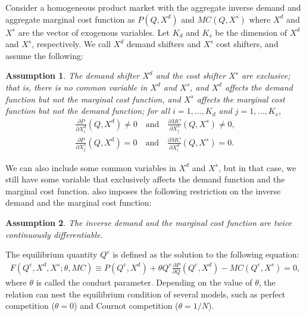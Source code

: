 \documentclass[11pt, a4paper]{article}
\newtheorem{assumption}{Assumption}
\theoremstyle{remark}
\begin{document}
Consider a homogeneous product market with the aggregate inverse demand and aggregate marginal cost function as $P(Q, X^{d})$ and $MC(Q, X^{s})$ where $X^{d}$ and $X^{s}$ are the vector of exogenous variables.
Let $K_d$ and $K_s$ be the dimension of $X^{d}$ and $X^{s}$, respectively.
We call $X^{d}$ demand shifters and $X^{s}$ cost shifters, and assume the following:
\begin{assumption}\label{assumption:exclusive_shifters}
    The demand shifter $X^{d}$ and the cost shifter $X^{s}$ are exclusive; that is, there is no common variable in $X^{d}$ and $X^{s}$, and $X^{d}$ affects the demand function but not the marginal cost function, and $X^{s}$ affects the marginal cost function but not the demand function; for all $i = 1, \ldots, K_d$ and $j = 1, \ldots, K_s$,
    \begin{align}
        \frac{\partial P}{\partial X^{d}_{i}}(Q, X^{d}) \ne 0 \quad \text{and} \quad \frac{\partial MC}{\partial X^{s}_{j}}(Q, X^{s}) \ne 0,\\
        \frac{\partial P}{\partial X^{s}_{j}}(Q, X^{d}) = 0 \quad \text{and} \quad \frac{\partial MC}{\partial X^{d}_{i}}(Q, X^{s}) = 0.
    \end{align}
\end{assumption}
We can also include some common variables in $X^{d}$ and $X^{s}$, but in that case, we still have some variable that exclusively affects the demand function and the marginal cost function.
\citet{lau1982identifying} also imposes the following restriction on the inverse demand and the marginal cost function:
\begin{assumption}\label{assumption:twice_differentiable}
    The inverse demand and the marginal cost function are twice continuously differentiable.
\end{assumption}

The equilibrium quantity $Q^e$ is defined as the solution to the following equation:
\begin{align}
    F(Q^e, X^{d}, X^{s}; \theta, MC) \equiv P(Q^e, X^{d}) + \theta Q^e\frac{\partial P}{\partial Q}(Q^e, X^{d}) - MC(Q^e, X^{s}) = 0, \label{eq:foc}
\end{align}
where $\theta$ is called the conduct parameter.
Depending on the value of $\theta$, the relation can nest the equilibrium condition of several models, such as perfect competition ($\theta=0$) and Cournot competition ($\theta=1/N$).
\end{document}
